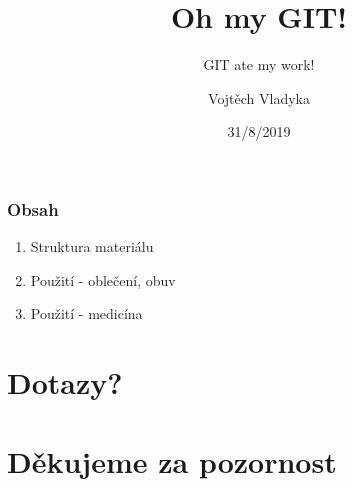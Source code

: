 \documentclass{beamer}
\title{Oh my GIT!}
\subtitle{GIT ate my work!}
\author{Vojtěch Vladyka}
\date{31/8/2019}
\begin{document}
    \frame{\titlepage}
	   \begin{frame}
           \frametitle{Obsah}
           \begin{enumerate}
               \item Struktura materiálu
               \item Použití - oblečení, obuv
               \item Použití - medicína
           \end{enumerate}
       \end{frame}
       \begin{frame}
       \end{frame}
       \section{Dotazy?}
       \section{Děkujeme za pozornost}
\end{document}
